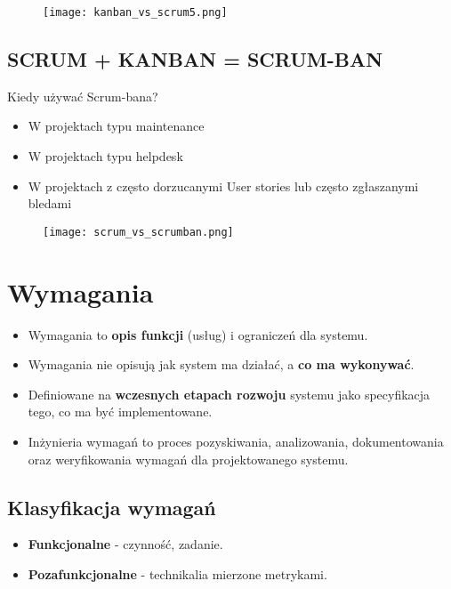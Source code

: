 \documentclass[a4paper]{article}
\begin{document}
    \begin{figure}[H]
        \texttt{[image: kanban\_vs\_scrum5.png]}
    \end{figure}

    \subsection{SCRUM + KANBAN = SCRUM-BAN}
    Kiedy używać Scrum-bana?
    \begin{itemize}
        \item W projektach typu maintenance
        \item W projektach typu helpdesk
        \item W projektach z często dorzucanymi User stories
        lub często zgłaszanymi bledami
    \end{itemize}

    \begin{figure}[H]
        \texttt{[image: scrum\_vs\_scrumban.png]}
    \end{figure}

    \section{Wymagania}
    \begin{itemize}
        \item Wymagania to \textbf{opis funkcji} (usług) i ograniczeń dla systemu.
        \item Wymagania nie opisują jak system ma działać, a \textbf{co ma
        wykonywać}.
        \item Definiowane na \textbf{wczesnych etapach rozwoju} systemu jako specyfikacja tego, co ma być
        implementowane.
        \item Inżynieria wymagań to proces pozyskiwania, analizowania, dokumentowania oraz weryfikowania
        wymagań dla projektowanego systemu.

    \end{itemize}

    \subsection{Klasyfikacja wymagań}
    \begin{itemize}
        \item \textbf{Funkcjonalne} - czynność, zadanie.
        \item \textbf{Pozafunkcjonalne} - technikalia mierzone metrykami.
    \end{itemize}
\end{document}
